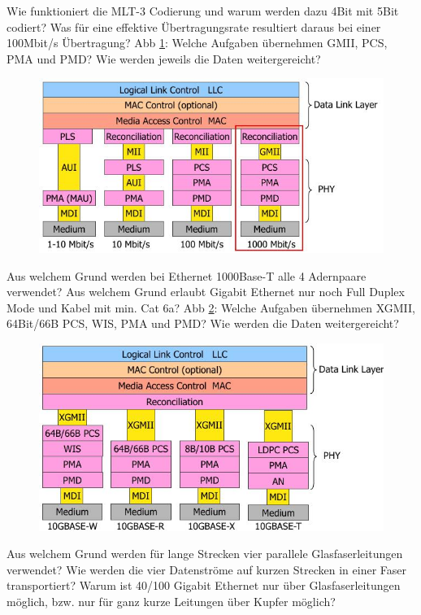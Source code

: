 \documentclass[ngerman,a4paper,12pt]{scrreprt}
\begin{document}
\olR
	\li Wie funktioniert die MLT-3 Codierung und warum werden dazu 4Bit mit 5Bit codiert? Was für eine effektive Übertragungsrate resultiert daraus bei einer 100Mbit/s Übertragung?
	\li Abb \ref{fasteth}: Welche Aufgaben übernehmen GMII, PCS, PMA und PMD? Wie werden jeweils die Daten weitergereicht?
	 	\begin{figure}[H]
			\centering
			\caption{}
			\includegraphics[scale=0.40]{img/R1.5.jpg}
			\label{fasteth}
		\end{figure}			 
	\li Aus welchem Grund werden bei Ethernet 1000Base-T alle 4 Adernpaare verwendet?
\olS
{}
\olR
	\li Aus welchem Grund erlaubt Gigabit Ethernet nur noch Full Duplex Mode und Kabel mit min. Cat 6a?
	\li Abb \ref{gigabeth}: Welche Aufgaben übernehmen XGMII, 64Bit/66B PCS, WIS, PMA und PMD? Wie werden die Daten weitergereicht? 	
		\begin{figure}[H]
			\centering
			\caption{}
			\includegraphics[scale=0.40]{img/R1.6.jpg}
			\label{gigabeth}
		\end{figure}			 
	\li Aus welchem Grund werden für lange Strecken vier parallele Glasfaserleitungen verwendet?
Wie werden die vier Datenströme auf kurzen Strecken in einer Faser transportiert?
\olS
{}
\olR
	\li Warum ist 40/100 Gigabit Ethernet nur über Glasfaserleitungen möglich, bzw. nur für ganz kurze Leitungen über Kupfer möglich?
\olS
\end{document}
